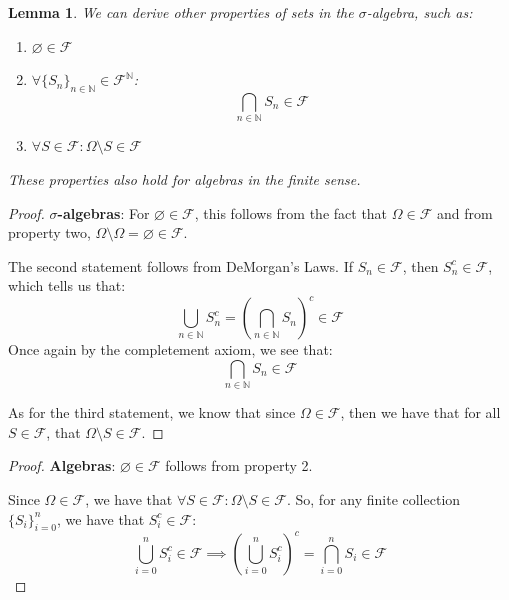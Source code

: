 \documentclass[10pt,letterpaper]{article} %
\newtheorem{lem}{Lemma}[section]
\begin{document}
\begin{lem}
We can derive other properties of sets in the $\sigma$-algebra, such as:
\begin{enumerate}
\item $\varnothing \in \mathcal{F}$
\item $\forall \{S_n\}_{n \in \mathbb{N}} \in \mathcal{F}^\mathbb{N}$:
\begin{equation*}
\bigcap_{n \in \mathbb{N}} S_n \in \mathcal{F}
\end{equation*}
\item $\forall S \in \mathcal{F}: \Omega \setminus S \in \mathcal{F}$
\end{enumerate}
These properties also hold for algebras in the finite sense.
\end{lem}
\begin{proof}
\textbf{$\sigma$-algebras}: For $\varnothing \in \mathcal{F}$, this follows from the fact that $\Omega \in \mathcal{F}$ and from property two, $\Omega \setminus \Omega = \varnothing \in \mathcal{F}$.

The second statement follows from DeMorgan's Laws. If $S_n \in \mathcal{F}$, then $S_n^c \in \mathcal{F}$, which tells us that:
\begin{equation*}
\bigcup_{n \in \mathbb{N}} S_n^c = \left(\bigcap_{n \in \mathbb{N}}S_n\right)^c \in \mathcal{F}
\end{equation*}
Once again by the completement axiom, we see that:
\begin{equation*}
\bigcap_{n \in \mathbb{N}}S_n \in \mathcal{F}
\end{equation*}

As for the third statement, we know that since $\Omega \in \mathcal{F}$, then we have that for all $S \in \mathcal{F}$, that $\Omega \setminus S \in \mathcal{F}$. 
\end{proof}

\begin{proof}
\textbf{Algebras}: $\varnothing \in \mathcal{F}$ follows from property 2.

Since $\Omega \in \mathcal{F}$, we have that $\forall S \in \mathcal{F}: \Omega \setminus S \in \mathcal{F}$. So, for any finite collection $\{S_i\}_{i = 0}^n$, we have that $S_i^c \in \mathcal{F}$:
\begin{equation*}
\bigcup_{i=0}^n S_i^c \in \mathcal{F} \implies \left(\bigcup_{i=0}^n S_i^c\right)^c = \bigcap_{i=0}^n S_i \in \mathcal{F}
\end{equation*}
\end{proof}
\end{document}
